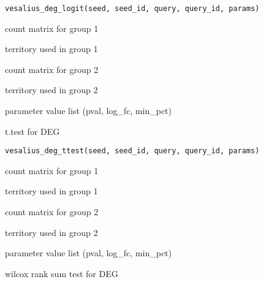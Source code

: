 \documentclass[a4paper]{book}
\begin{document}
%
\begin{Usage}
\begin{verbatim}
vesalius_deg_logit(seed, seed_id, query, query_id, params)
\end{verbatim}
\end{Usage}
%
\begin{Arguments}
\begin{ldescription}
\item[\code{seed}] count matrix for group 1

\item[\code{seed\_id}] territory used in group 1

\item[\code{query}] count matrix for group 2

\item[\code{query\_id}] territory used in group 2

\item[\code{params}] parameter value list (pval, log\_fc, min\_pct)
\end{ldescription}
\end{Arguments}
%
\begin{Description}
t.test for DEG
\end{Description}
%
\begin{Usage}
\begin{verbatim}
vesalius_deg_ttest(seed, seed_id, query, query_id, params)
\end{verbatim}
\end{Usage}
%
\begin{Arguments}
\begin{ldescription}
\item[\code{seed}] count matrix for group 1

\item[\code{seed\_id}] territory used in group 1

\item[\code{query}] count matrix for group 2

\item[\code{query\_id}] territory used in group 2

\item[\code{params}] parameter value list (pval, log\_fc, min\_pct)
\end{ldescription}
\end{Arguments}
%
\begin{Description}
wilcox rank sum test for DEG
\end{Description}
\end{document}
